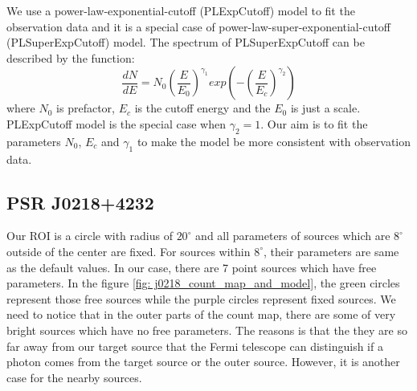 \documentclass[12pt]{report}
\begin{document}
        We use a power-law-exponential-cutoff (PLExpCutoff) model to fit the observation data and 
        it is a special case of power-law-super-exponential-cutoff (PLSuperExpCutoff) model. 
        The spectrum of PLSuperExpCutoff can be described by the function: 
            \begin{equation} 
              \label{eq: fermi_model}
              \frac{dN}{dE} = N_{0} \left(\frac{E}{E_0}\right)^{\gamma_1} 
              exp\left(-\left(\frac{E}{E_c}\right)^{\gamma_2}\right)
            \end{equation}
        where $N_0$ is prefactor, $E_c$ is the cutoff energy and the $E_0$ is just a scale. 
        PLExpCutoff model is the special case when $\gamma_2=1$. Our aim is to fit the parameters 
        $N_0$, $E_c$ and $\gamma_1$ to make the model be more consistent with observation data.

        \subsection{PSR J0218+4232}
          \label{j0218}
          Our ROI is a circle with radius of $20^\circ$ and all parameters of sources which are $8^\circ$ outside 
          of the center are fixed. For sources within $8^\circ$, their parameters are same as the default values. 
          In our case, there are 7 point sources which have free parameters. In the figure 
          \ref{fig: j0218_count_map_and_model}, the green circles represent those free sources while the purple circles 
          represent fixed sources. We need to notice that in the outer parts of the count map, there are some of very 
          bright sources which have no free parameters. The reasons is that the they are so far away from our target source
          that the Fermi telescope can distinguish if a photon comes from the target source or the outer source. However, 
          it is another case for the nearby sources. 
\end{document}
